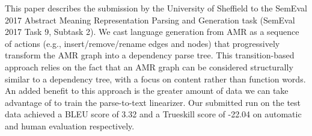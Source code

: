 This paper describes the submission by the University of Sheffield to the SemEval 2017 Abstract Meaning Representation Parsing and Generation task (SemEval 2017 Task 9, Subtask 2). We cast language generation from AMR as a sequence of actions (e.g., insert/remove/rename edges and nodes) that progressively transform the AMR  graph into a dependency parse tree. This transition-based approach relies on the fact that an AMR graph can be considered structurally similar to a dependency tree, with a focus on content rather than function words. An added benefit to this approach is the greater amount of data we can take advantage of to train the parse-to-text linearizer. Our submitted run on the test data achieved a BLEU score of 3.32 and a Trueskill score of -22.04 on automatic and human evaluation respectively.
